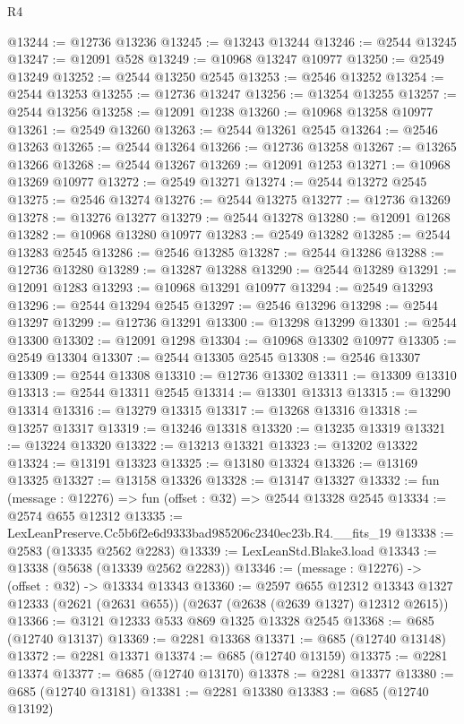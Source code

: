 \begin{lexlean}{R4}
\begin{coremodule}
@13244 := @12736 @13236
@13245 := @13243 @13244
@13246 := @2544 @13245
@13247 := @12091 @528
@13249 := @10968 @13247 @10977
@13250 := @2549 @13249
@13252 := @2544 @13250 @2545
@13253 := @2546 @13252
@13254 := @2544 @13253
@13255 := @12736 @13247
@13256 := @13254 @13255
@13257 := @2544 @13256
@13258 := @12091 @1238
@13260 := @10968 @13258 @10977
@13261 := @2549 @13260
@13263 := @2544 @13261 @2545
@13264 := @2546 @13263
@13265 := @2544 @13264
@13266 := @12736 @13258
@13267 := @13265 @13266
@13268 := @2544 @13267
@13269 := @12091 @1253
@13271 := @10968 @13269 @10977
@13272 := @2549 @13271
@13274 := @2544 @13272 @2545
@13275 := @2546 @13274
@13276 := @2544 @13275
@13277 := @12736 @13269
@13278 := @13276 @13277
@13279 := @2544 @13278
@13280 := @12091 @1268
@13282 := @10968 @13280 @10977
@13283 := @2549 @13282
@13285 := @2544 @13283 @2545
@13286 := @2546 @13285
@13287 := @2544 @13286
@13288 := @12736 @13280
@13289 := @13287 @13288
@13290 := @2544 @13289
@13291 := @12091 @1283
@13293 := @10968 @13291 @10977
@13294 := @2549 @13293
@13296 := @2544 @13294 @2545
@13297 := @2546 @13296
@13298 := @2544 @13297
@13299 := @12736 @13291
@13300 := @13298 @13299
@13301 := @2544 @13300
@13302 := @12091 @1298
@13304 := @10968 @13302 @10977
@13305 := @2549 @13304
@13307 := @2544 @13305 @2545
@13308 := @2546 @13307
@13309 := @2544 @13308
@13310 := @12736 @13302
@13311 := @13309 @13310
@13313 := @2544 @13311 @2545
@13314 := @13301 @13313
@13315 := @13290 @13314
@13316 := @13279 @13315
@13317 := @13268 @13316
@13318 := @13257 @13317
@13319 := @13246 @13318
@13320 := @13235 @13319
@13321 := @13224 @13320
@13322 := @13213 @13321
@13323 := @13202 @13322
@13324 := @13191 @13323
@13325 := @13180 @13324
@13326 := @13169 @13325
@13327 := @13158 @13326
@13328 := @13147 @13327
@13332 := fun (message : @12276) => fun (offset : @32) => @2544 @13328 @2545
@13334 := @2574 @655 @12312
@13335 := LexLeanPreserve.Cc5b6f2e6d9333bad985206c2340ec23b.R4.__fits_19
@13338 := @2583 (@13335 @2562 @2283)
@13339 := LexLeanStd.Blake3.load
@13343 := @13338 (@5638 (@13339 @2562 @2283))
@13346 := (message : @12276) -> (offset : @32) -> @13334 @13343
@13360 := @2597
    @655
    @12312
    @13343
    @1327
    @12333
    (@2621 (@2631 @655))
    (@2637 (@2638 (@2639 @1327) @12312 @2615))
@13366 := @3121 @12333 @533 @869 @1325 @13328 @2545
@13368 := @685 (@12740 @13137)
@13369 := @2281 @13368
@13371 := @685 (@12740 @13148)
@13372 := @2281 @13371
@13374 := @685 (@12740 @13159)
@13375 := @2281 @13374
@13377 := @685 (@12740 @13170)
@13378 := @2281 @13377
@13380 := @685 (@12740 @13181)
@13381 := @2281 @13380
@13383 := @685 (@12740 @13192)

\end{coremodule}
\end{lexlean}
